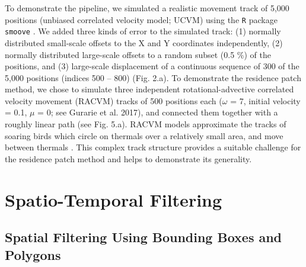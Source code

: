 \documentclass[10pt,paper=a4,headings=standardclasses
]{scrartcl}
\begin{document}
To demonstrate the pipeline, we simulated a realistic movement track of 5,000 positions (unbiased correlated velocity model; UCVM) using the \texttt{R} package \texttt{smoove} \citep[][see Fig. 2.a]{gurarie2017}.
We added three kinds of error to the simulated track: (1) normally distributed small-scale offsets to the X and Y coordinates independently, (2) normally distributed large-scale offsets to a random subset (0.5 \%) of the positions, and (3) large-scale displacement of a continuous sequence of 300 of the 5,000 positions (indices 500 -- 800) (Fig. 2.a).
To demonstrate the residence patch method, we chose to simulate three independent rotational-advective correlated velocity movement (RACVM) tracks of 500 positions each ($\omega$ = 7, initial velocity = 0.1, $\mu$ = 0; see Gurarie et al. 2017), and connected them together with a roughly linear path (see Fig. 5.a).
RACVM models approximate the tracks of soaring birds which circle on thermals over a relatively small area, and move between thermals \citep[`thermalling'; ][]{gurarie2017, harel2016}.
This complex track structure provides a suitable challenge for the residence patch method and helps to demonstrate its generality.

\section{Spatio-Temporal Filtering}

\subsection{Spatial Filtering Using Bounding Boxes and Polygons}
\end{document}
